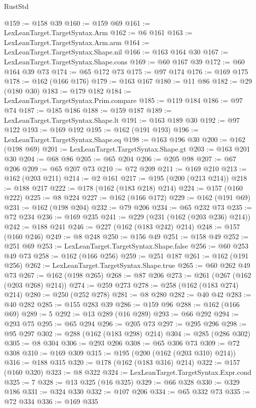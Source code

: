 \begin{lexlean}{RustStd}
\begin{coremodule}
@159 := @158 @39
@160 := @159 @69
@161 := LexLeanTarget.TargetSyntax.Arm
@162 := @6 @161
@163 := LexLeanTarget.TargetSyntax.Arm.arm
@164 := LexLeanTarget.TargetSyntax.Shape.nil
@166 := @163 @164 @30
@167 := LexLeanTarget.TargetSyntax.Shape.cons
@169 := @60 @167 @39
@172 := @60 @164 @39 @73
@174 := @65 @172 @73
@175 := @97 @174
@176 := @169 @175
@178 := @162 (@166 @176)
@179 := @163 @167
@180 := @11 @86
@182 := @29 (@180 @30)
@183 := @179 @182
@184 := LexLeanTarget.TargetSyntax.Prim.compare
@185 := @119 @184
@186 := @97 @74
@187 := @185 @186
@188 := @159 @187
@189 := LexLeanTarget.TargetSyntax.Shape.lt
@191 := @163 @189 @30
@192 := @97 @122
@193 := @169 @192
@195 := @162 (@191 @193)
@196 := LexLeanTarget.TargetSyntax.Shape.eq
@198 := @163 @196 @30
@200 := @162 (@198 @69)
@201 := LexLeanTarget.TargetSyntax.Shape.gt
@203 := @163 @201 @30
@204 := @68 @86
@205 := @65 @204
@206 := @205 @98
@207 := @67 @206
@209 := @65 @207 @73
@210 := @72 @209
@211 := @169 @210
@213 := @162 (@203 @211)
@214 := @2 @161
@217 := @195 (@200 (@213 @214))
@218 := @188 @217
@222 := @178 (@162 (@183 @218) @214)
@224 := @157 (@160 @222)
@225 := @8 @224
@227 := @162 (@166 @172)
@229 := @162 (@191 @69)
@231 := @162 (@198 @204)
@232 := @79 @206
@234 := @65 @232 @73
@235 := @72 @234
@236 := @169 @235
@241 := @229 (@231 (@162 (@203 @236) @214))
@242 := @188 @241
@246 := @227 (@162 (@183 @242) @214)
@248 := @157 (@160 @246)
@249 := @8 @248
@250 := @156 @49
@251 := @158 @49
@252 := @251 @69
@253 := LexLeanTarget.TargetSyntax.Shape.false
@256 := @60 @253 @49 @73
@258 := @162 (@166 @256)
@259 := @251 @187
@261 := @162 (@191 @256)
@262 := LexLeanTarget.TargetSyntax.Shape.true
@265 := @60 @262 @49 @73
@267 := @162 (@198 @265)
@268 := @87 @206
@273 := @261 (@267 (@162 (@203 @268) @214))
@274 := @259 @273
@278 := @258 (@162 (@183 @274) @214)
@280 := @250 (@252 @278)
@281 := @8 @280
@282 := @40 @42
@283 := @40 @282
@285 := @155 @283 @39
@286 := @159 @96
@288 := @162 (@166 @69)
@289 := 5
@292 := @13 @289 (@16 @289)
@293 := @66 @292
@294 := @293 @75
@295 := @65 @294
@296 := @205 @73
@297 := @295 @296
@298 := @95 @297
@302 := @288 (@162 (@183 @298) @214)
@304 := @285 (@286 @302)
@305 := @8 @304
@306 := @293 @206
@308 := @65 @306 @73
@309 := @72 @308
@310 := @169 @309
@315 := @195 (@200 (@162 (@203 @310) @214))
@316 := @188 @315
@320 := @178 (@162 (@183 @316) @214)
@322 := @157 (@160 @320)
@323 := @8 @322
@324 := LexLeanTarget.TargetSyntax.Expr.cond
@325 := 7
@328 := @13 @325 (@16 @325)
@329 := @66 @328
@330 := @329 @186
@331 := @324 @330
@332 := @107 @206
@334 := @65 @332 @73
@335 := @72 @334
@336 := @169 @335

\end{coremodule}
\end{lexlean}
